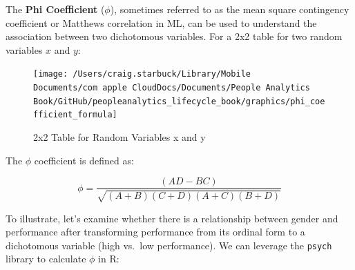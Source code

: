 \documentclass[]{book}
\newenvironment{Shaded}{\begin{snugshade}}{\end{snugshade}}
\newcommand{\CommentTok}[1]{\textcolor[rgb]{0.56,0.35,0.01}{\textit{#1}}}
\newcommand{\DecValTok}[1]{\textcolor[rgb]{0.00,0.00,0.81}{#1}}
\newcommand{\KeywordTok}[1]{\textcolor[rgb]{0.13,0.29,0.53}{\textbf{#1}}}
\newcommand{\NormalTok}[1]{#1}
\newcommand{\OperatorTok}[1]{\textcolor[rgb]{0.81,0.36,0.00}{\textbf{#1}}}
\newcommand{\StringTok}[1]{\textcolor[rgb]{0.31,0.60,0.02}{#1}}
\begin{document}
The \textbf{Phi Coefficient} (\(\phi\)), sometimes referred to as the mean square contingency coefficient or Matthews correlation in ML, can be used to understand the association between two dichotomous variables. For a 2x2 table for two random variables \(x\) and \(y\):

\begin{figure}

{\centering \texttt{[image: /Users/craig.starbuck/Library/Mobile Documents/com~apple~CloudDocs/Documents/People Analytics Book/GitHub/peopleanalytics\_lifecycle\_book/graphics/phi\_coefficient\_formula]} 

}

\caption{2x2 Table for Random Variables x and y}\label{fig:phi-tbl}
\end{figure}

The \(\phi\) coefficient is defined as:

\[ \phi = {\frac {(AD-BC)}{\sqrt{(A+B)(C+D)(A+C)(B+D)}}} \]

To illustrate, let's examine whether there is a relationship between gender and performance after transforming performance from its ordinal form to a dichotomous variable (high vs.~low performance). We can leverage the \texttt{psych} library to calculate \(\phi\) in R:

\begin{Shaded}
\end{Shaded}
\end{document}
